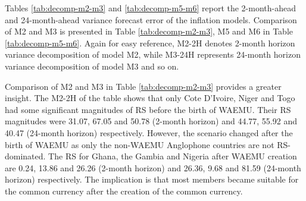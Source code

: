 \documentclass[]{article}
\begin{document}
Tables \ref{tab:decomp-m2-m3} and \ref{tab:decomp-m5-m6} report the 2-month-ahead and 24-month-ahead variance forecast error of the inflation models. Comparison of M2 and M3 is presented in Table \ref{tab:decomp-m2-m3}, M5 and M6 in Table \ref{tab:decomp-m5-m6}. Again for easy reference, M2-2H denotes 2-month horizon variance decomposition of model M2, while M3-24H represents 24-month horizon variance decomposition of model M3 and so on.

Comparison of M2 and M3 in Table \ref{tab:decomp-m2-m3} provides a greater insight. The M2-2H of the table shows that only Cote D'Ivoire, Niger and Togo had some significant magnitudes of RS before the birth of WAEMU. Their RS magnitudes were 31.07, 67.05 and 50.78 (2-month horizon) and 44.77, 55.92 and 40.47 (24-month horizon) respectively. However, the scenario changed after the birth of WAEMU as only the non-WAEMU Anglophone countries are not RS-dominated. The RS for Ghana, the Gambia and Nigeria after WAEMU creation are 0.24, 13.86 and 26.26 (2-month horizon) and 26.36, 9.68 and 81.59 (24-month horizon) respectively. The implication is that most members became suitable for the common currency after the creation of the common currency.
\end{document}
